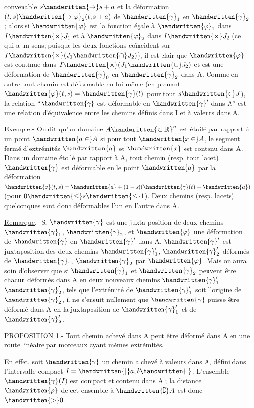 
convenable $s\handwritten{\to}s+a$ et la déformation $(t,s)\handwritten{\to\varphi}_2(t,s+a)$ de $\handwritten{\gamma}_1$ en $\handwritten{\gamma}_2$ ; alors si $\handwritten{\varphi}$ est la fonction égale à $\handwritten{\varphi}_1$ dans $I\handwritten{\times}J_1$ et à $\handwritten{\varphi}_2$ dans $I\handwritten{\times}J_2$ (ce qui a un sens; puisque les deux fonctions coïncident sur $I\handwritten{\times}(J_1\handwritten{\cap}J_2)$), il est clair que $\handwritten{\varphi}$ est continue dans $I\handwritten{\times}(J_1\handwritten{\cup}J_2)$ et est une déformation de $\handwritten{\gamma}_0$ en $\handwritten{\gamma}_2$ dans A. Comme en outre tout chemin est déformable en lui-même (en prenant $\handwritten{\varphi}(t,s)=\handwritten{\gamma}(t)$ pour tout $s\handwritten{\in}J$), la relation ``$\handwritten{\gamma}$ est déformable en $\handwritten{\gamma}'$ dans A'' est une \uline{relation d'équivalence} entre les chemins définis dans I et à valeurs dans A.

\uline{Exemple}.- On dit qu'un domaine $A\handwritten{\subset\mathbb{R}}^n$ est \uline{étoilé} par rapport à un point $\handwritten{a\in}A$ si pour tout $\handwritten{x\in}A$, le segment fermé d'extrémités $\handwritten{a}$ et $\handwritten{x}$ est contenu dans A. Dans un domaine étoilé par rapport à A, \uline{tout chemin} (resp. \uline{tout lacet}) $\handwritten{\gamma}$ \uline{est déformable en le point} $\handwritten{a}$ par la déformation $\handwritten{\varphi}(t,s)=\handwritten{a}+(1-s)(\handwritten{\gamma}(t)-\handwritten{a})$ (pour $0\handwritten{\leq}s\handwritten{\leq}1$). Deux chemins (resp. lacets) quelconques sont donc déformables l'un en l'autre dans A.

\uline{Remarque}.- Si $\handwritten{\gamma}$ est une juxta-position de deux chemins $\handwritten{\gamma}_1$, $\handwritten{\gamma}_2$, et $\handwritten{\varphi}$ une déformation de $\handwritten{\gamma}$ en $\handwritten{\gamma}'$ dans A, $\handwritten{\gamma}'$ est juxtaposition des deux chemins $\handwritten{\gamma}'_1$, $\handwritten{\gamma}'_2$ déformés de $\handwritten{\gamma}_1$, $\handwritten{\gamma}_2$ par $\handwritten{\varphi}$. Mais on aura soin d'observer que si $\handwritten{\gamma}_1$ et $\handwritten{\gamma}_2$ peuvent être \uline{chacun} déformés dans A en deux nouveaux chemins $\handwritten{\gamma}'_1$\unsure{,|} $\handwritten{\gamma}'_2$, tels que l'extrémité de $\handwritten{\gamma}'_1$ soit l'origine de $\handwritten{\gamma}'_2$, il ne s'ensuit nullement que $\handwritten{\gamma}$ puisse être déformé dans A en la juxtaposition de $\handwritten{\gamma}'_1$ et de $\handwritten{\gamma}'_2$.

PROPOSITION 1.- \uline{Tout chemin achevé dans} A \uline{peut être déformé dans} A \uline{en une route linéaire par morceaux ayant mêmes extrémités}.

En effet, soit $\handwritten{\gamma}$ un chemin a chevé à valeurs dans A, défini dans l'intervalle compact $I=\handwritten{[}a,b\handwritten{]}$. L'ensemble $\handwritten{\gamma}(I)$ est compact et contenu dans A ; la distance $\handwritten{\rho}$ de cet ensemble à $\handwritten{\complement}A$ est donc $\handwritten{>}0$.
